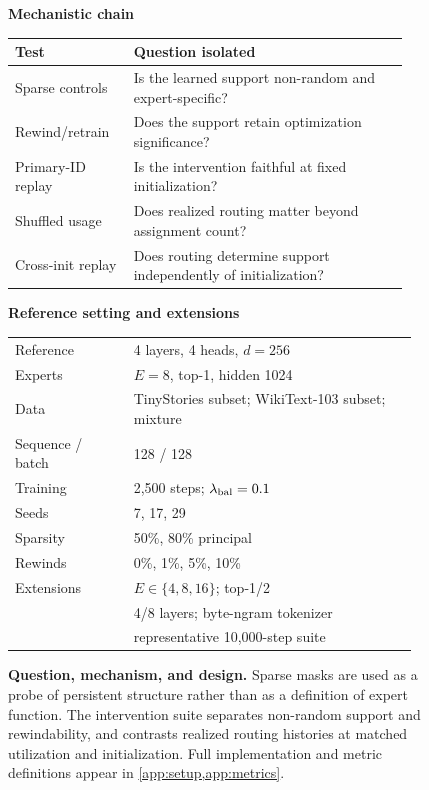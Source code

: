 \documentclass{article}
\begin{document}
\begin{figure}[t]
\centering
\begin{minipage}[t]{0.56\textwidth}
\centering
\small
\textbf{Mechanistic chain}\\[3pt]
\vspace{5pt}

\begin{tabular}{@{}p{0.28\linewidth}p{0.65\linewidth}@{}}
\toprule
Test & Question isolated \\
\midrule
Sparse controls & Is the learned support non-random and expert-specific? \\
Rewind/retrain & Does the support retain optimization significance? \\
Primary-ID replay & Is the intervention faithful at fixed initialization? \\
Shuffled usage & Does realized routing matter beyond assignment count? \\
Cross-init replay & Does routing determine support independently of initialization? \\
\bottomrule
\end{tabular}
\end{minipage}
\hfill
\begin{minipage}[t]{0.40\textwidth}
\centering
\small
\textbf{Reference setting and extensions}\\[3pt]
\begin{tabular}{@{}p{0.28\linewidth}p{0.67\linewidth}@{}}
\toprule
Reference & 4 layers, 4 heads, $d=256$ \\
Experts & $E=8$, top-1, hidden 1024 \\
Data & TinyStories subset; WikiText-103 subset; mixture \\
Sequence / batch & 128 / 128 \\
Training & 2,500 steps; $\lambda_{\rm bal}=0.1$ \\
Seeds & 7, 17, 29 \\
Sparsity & 50\%, 80\% principal \\
Rewinds & 0\%, 1\%, 5\%, 10\% \\
\midrule
Extensions & $E\in\{4,8,16\}$; top-1/2 \\
 & 4/8 layers; byte-ngram tokenizer \\
 & representative 10,000-step suite \\
\bottomrule
\end{tabular}
\end{minipage}
\caption{\textbf{Question, mechanism, and design.} Sparse masks are used as a
probe of persistent structure rather than as a definition of expert function.
The intervention suite separates non-random support and rewindability, and
contrasts realized routing histories at matched utilization and initialization.
Full implementation and metric
definitions appear in \cref{app:setup,app:metrics}.}
\label{fig:design}
\end{figure}
\end{document}

